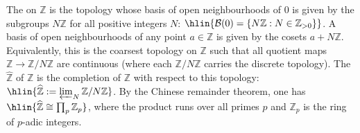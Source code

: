 \begin{definition} \label{definition:profinite_topology_on_Z}
The  on $\mathbb{Z}$ is the topology whose basis of open neighbourhoods of $0$ is given by the subgroups $N\mathbb{Z}$ for all positive integers $N$:
$\hlin{\mathcal{B}(0) = \{ N\mathbb{Z} : N \in \mathbb{Z}_{>0} \}}$.
A basis of open neighbourhoods of any point $a \in \mathbb{Z}$ is given by the cosets $a + N\mathbb{Z}$.
Equivalently, this is the coarsest topology on $\mathbb{Z}$ such that all quotient maps $\mathbb{Z} \to \mathbb{Z}/N\mathbb{Z}$ are continuous (where each $\mathbb{Z}/N\mathbb{Z}$ carries the discrete topology).
The  $\widehat{\mathbb{Z}}$ of $\mathbb{Z}$ is the completion of $\mathbb{Z}$ with respect to this topology:
$\hlin{\widehat{\mathbb{Z}} := \varprojlim_{N} \mathbb{Z}/N\mathbb{Z}}$.
By the Chinese remainder theorem, one has $\hlin{\widehat{\mathbb{Z}} \cong \prod_{p} \mathbb{Z}_p}$, where the product runs over all primes $p$ and $\mathbb{Z}_p$ is the ring of $p$-adic integers.
\end{definition}
